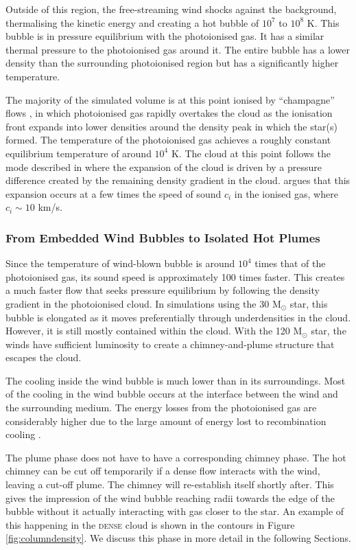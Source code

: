 \documentclass[a4paper,fleqn,usenatbib]{mnras}
\newcommand{\Msolar}{M$_{\odot}$\xspace}
\begin{document}
Outside of this region, the free-streaming wind shocks against the background, thermalising the kinetic energy and creating a hot bubble of $10^7$ to $10^8$ K. This bubble is in pressure equilibrium with the photoionised gas. It has a similar thermal pressure to the photoionised gas around it. The entire bubble has a lower density than the surrounding photoionised region but has a significantly higher temperature.

The majority of the simulated volume is at this point ionised by ``champagne'' flows \citep{Bodenheimer1979,TenorioTagle1979,Whitworth1979}, in which photoionised gas rapidly overtakes the cloud as the ionisation front expands into lower densities around the density peak in which the star(s) formed. The temperature of the photoionised gas achieves a roughly constant equilibrium temperature of around $10^4$ K. The cloud at this point follows the mode described in \cite{Franco1990} where the expansion of the cloud is driven by a pressure difference created by the remaining density gradient in the cloud. \cite{Franco1990} argues that this expansion occurs at a few times the speed of sound $c_i$ in the ionised gas, where $c_i\sim10$ km/s.

\subsubsection{From Embedded Wind Bubbles to Isolated Hot Plumes}
\label{results:evolutionwindbubble:phases}

Since the temperature of wind-blown bubble is around $10^4$ times that of the photoionised gas, its sound speed is approximately 100 times faster. This creates a much faster flow that seeks pressure equilibrium by following the density gradient in the photoionised cloud. In simulations using the 30 \Msolar star, this bubble is elongated as it moves preferentially through underdensities in the cloud. However, it is still mostly contained within the cloud. With the 120 \Msolar star, the winds have sufficient luminosity to create a chimney-and-plume structure that escapes the cloud.

The cooling inside the wind bubble is much lower than in its surroundings. Most of the cooling in the wind bubble occurs at the interface between the wind and the surrounding medium. The energy losses from the photoionised gas are considerably higher due to the large amount of energy lost to recombination cooling \citep[see the analysis by][]{Walch2012}. 

The plume phase does not have to have a corresponding chimney phase. The hot chimney can be cut off temporarily if a dense flow interacts with the wind, leaving a cut-off plume. The chimney will re-establish itself shortly after. This gives the impression of the wind bubble reaching radii towards the edge of the bubble without it actually interacting with gas closer to the star. An example of this happening in the \textsc{dense} cloud is shown in the contours in Figure \ref{fig:columndensity}. We discuss this phase in more detail in the following Sections.
\end{document}
